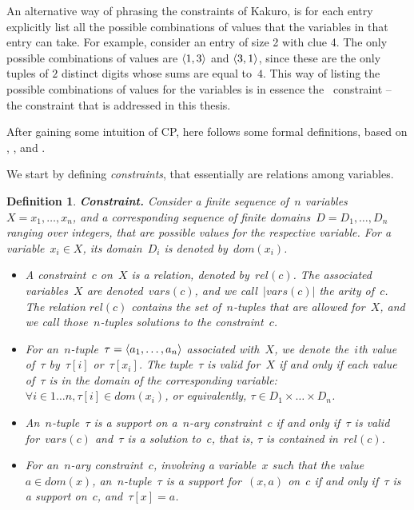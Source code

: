 \documentclass[a4paper,11pt]{article}
\newtheorem{definition}{Definition}
\newcommand{\Table}{\Constraint{Table}}
\numberwithin{equation}{section}
\begin{document}
An alternative way of phrasing the constraints of Kakuro, is for each entry
explicitly list all the possible combinations
of values that the variables in that entry can take.
For example, consider an entry of size 2 with clue 4. The only
possible combinations of values are $\left\langle1,3\right\rangle$ and $\left\langle3,1\right\rangle$, since
these are the only tuples of $2$ distinct digits whose sums are 
equal to~$4$. This way of listing the possible combinations of 
values for the variables is in essence the 
\Table~constraint -- the constraint that is
addressed in this thesis.

\smallskip 

After gaining some intuition of CP, here follows some formal definitions, based on
\cite{SchulteCarlsson:FDsys}, \cite{Apt:constraintsBook}, and \cite{Gecode:MPG}.

We start by defining \emph{constraints}, that essentially are relations
among variables.

\begin{definition}
  \label{def:constraint}
  \textbf{Constraint.} Consider a finite sequence of~$n$ 
  variables~$X = x_1,\ldots,x_n$, and a corresponding sequence of
  finite \emph{domains}~$D = D_1,\ldots,D_n$ ranging over integers,
  that are possible values for the
  respective variable. 
  For a variable~$x_i \in X$, its domain~$D_i$ is denoted 
  by~$dom(x_i)$.
  \begin{itemize}
    \item   A \emph{constraint}~$c$ on~$X$ is a relation, 
      denoted by~$rel(c)$. The associated variables~$X$ are denoted~$vars(c)$,
      and we call~$|vars(c)|$ the \emph{arity} of~$c$. The relation
      $rel(c)$ contains the set of~$n$-tuples that are allowed
      for~$X$, and we call those~$n$-tuples \emph{solutions} to the constraint~$c$.
    \item   For an~$n$-tuple~$\tau = \left\langle a_1,\ldots,a_n\right\rangle$ associated with~$X$, we
      denote the~$i$th value of~$\tau$ by~$\tau[i]$ or~$\tau[x_i]$. The 
      tuple~$\tau$ is \emph{valid} for~$X$
      if and only if each value of~$\tau$ is in the domain of the corresponding
      variable: $\forall i \in 1 \ldots n, \tau[i] \in dom(x_i)$, or equivalently,
      $\tau \in D_1 \times \ldots \times D_n$.
    \item An~$n$-tuple~$\tau$ is a \emph{support} on a~$n$-ary constraint~$c$ if and only
      if~$\tau$ is valid for~$vars(c)$ and~$\tau$ is a solution to~$c$, that is,
      $\tau$ is contained in~$rel(c)$.
    \item For an~$n$-ary constraint~$c$, involving a variable~$x$ such that
      the value~$a \in dom(x)$, an~$n$-tuple~$\tau$ is a 
      \emph{support for}~$(x,a)$ on~$c$ if and only if~$\tau$ is a support on~$c$,
      and~$\tau[x] = a$.
    \end{itemize}
\end{definition}
\end{document}
